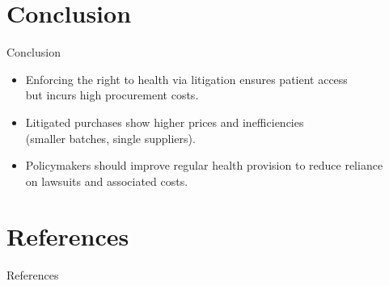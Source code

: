 \documentclass{beamer}
\begin{document}
\section{Conclusion}

\begin{frame}{Conclusion}
  \begin{itemize}
    \item Enforcing the right to health via litigation ensures patient access \\but incurs high procurement costs.
    \item Litigated purchases show higher prices and inefficiencies \\(smaller batches, single suppliers).
    \item Policymakers should improve regular health provision to reduce reliance \\on lawsuits and associated costs.
  \end{itemize}
\end{frame}

\section*{References}

\begin{frame}[allowframebreaks]{References}
  \footnotesize
  
  
\end{frame}
\end{document}
